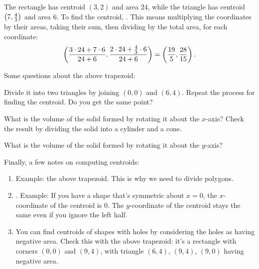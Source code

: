 \documentclass[11pt,paper=letter]{scrartcl}
\begin{document}
The rectangle has centroid $(3, 2)$ and area $24$, while the triangle has centroid $\left( 7, \frac43 \right)$ and area $6$. To find the centroid, . This means multiplying the coordinates by their areas, taking their sum, then dividing by the total area, for each coordinate:
$$\left( \frac{3 \cdot 24 + 7 \cdot 6}{24 + 6}, \frac{2 \cdot 24 + \frac43 \cdot 6}{24 + 6} \right) = \left( \frac{19}5, \frac{28}{15} \right).$$ 
\vspace{-12pt}
\begin{exboxed}
  Some questions about the above trapezoid:
  \begin{enumthin}
    \item[(a)] Divide it into two triangles by joining $(0, 0)$ and $(6, 4)$. Repeat the process for finding the centroid. Do you get the same point?
    \item[(b)] What is the volume of the solid formed by rotating it about the $x$-axis? Check the result by dividing the solid into a cylinder and a cone.
    \item[(c)] What is the volume of the solid formed by rotating it about the $y$-axis?
  \end{enumthin}
\end{exboxed}

Finally, a few notes on computing centroids:
\begin{enumerate}
  \item {} Example: the above trapezoid. This is why we need to divide polygons.
  \item {}. Example: If you have a shape that's symmetric about $x=0$, the $x$-coordinate of the centroid is $0$. The $y$-coordinate of the centroid stays the same even if you ignore the left half.
  \item You can find centroids of shapes with holes by considering the holes as having negative area. Check this with the above trapezoid: it's a rectangle with corners $(0, 0)$ and $(9, 4)$, with triangle $(6, 4)$, $(9, 4)$, $(9, 0)$ having negative area.
\end{enumerate}
\end{document}
